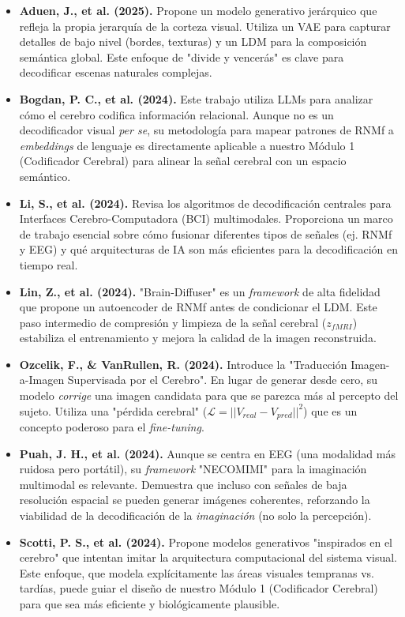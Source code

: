 \documentclass{article}
\begin{document}
\begin{itemize}
    \item \textbf{Aduen, J., et al. (2025)\cite{1}.} Propone un modelo generativo jerárquico que refleja la propia jerarquía de la corteza visual. Utiliza un VAE para capturar detalles de bajo nivel (bordes, texturas) y un LDM para la composición semántica global. Este enfoque de "divide y vencerás" es clave para decodificar escenas naturales complejas.
    
    \item \textbf{Bogdan, P. C., et al. (2024)\cite{3}.} Este trabajo utiliza LLMs para analizar cómo el cerebro codifica información relacional. Aunque no es un decodificador visual \textit{per se}, su metodología para mapear patrones de RNMf a \textit{embeddings} de lenguaje es directamente aplicable a nuestro Módulo 1 (Codificador Cerebral) para alinear la señal cerebral con un espacio semántico.
    
    \item \textbf{Li, S., et al. (2024)\cite{4}.} Revisa los algoritmos de decodificación centrales para Interfaces Cerebro-Computadora (BCI) multimodales. Proporciona un marco de trabajo esencial sobre cómo fusionar diferentes tipos de señales (ej. RNMf y EEG) y qué arquitecturas de IA son más eficientes para la decodificación en tiempo real.
    
    \item \textbf{Lin, Z., et al. (2024)\cite{5}.} "Brain-Diffuser" es un \textit{framework} de alta fidelidad que propone un autoencoder de RNMf antes de condicionar el LDM. Este paso intermedio de compresión y limpieza de la señal cerebral ($z_{fMRI}$) estabiliza el entrenamiento y mejora la calidad de la imagen reconstruida.
    
    \item \textbf{Ozcelik, F., \& VanRullen, R. (2024)\cite{6}.} Introduce la "Traducción Imagen-a-Imagen Supervisada por el Cerebro". En lugar de generar desde cero, su modelo \textit{corrige} una imagen candidata para que se parezca más al percepto del sujeto. Utiliza una "pérdida cerebral" ($\mathcal{L} = ||V_{real} - V_{pred}||^2$) que es un concepto poderoso para el \textit{fine-tuning}.
    
    \item \textbf{Puah, J. H., et al. (2024)\cite{7}.} Aunque se centra en EEG (una modalidad más ruidosa pero portátil), su \textit{framework} "NECOMIMI" para la imaginación multimodal es relevante. Demuestra que incluso con señales de baja resolución espacial se pueden generar imágenes coherentes, reforzando la viabilidad de la decodificación de la \textit{imaginación} (no solo la percepción).
    
    \item \textbf{Scotti, P. S., et al. (2024)\cite{10}.} Propone modelos generativos "inspirados en el cerebro" que intentan imitar la arquitectura computacional del sistema visual. Este enfoque, que modela explícitamente las áreas visuales tempranas vs. tardías, puede guiar el diseño de nuestro Módulo 1 (Codificador Cerebral) para que sea más eficiente y biológicamente plausible.
\end{itemize}
\end{document}

